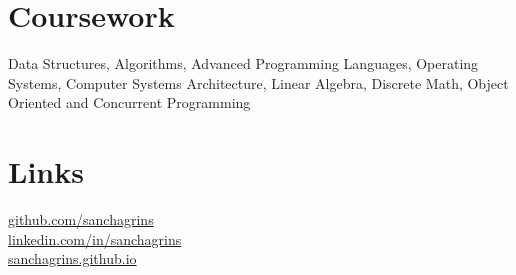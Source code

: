 \documentclass[]{sanchagrins-resume}
\begin{document}
\begin{minipage}[t]{0.33\textwidth}

\section{Coursework} 
Data Structures, Algorithms, Advanced Programming Languages,
Operating Systems, Computer Systems Architecture,
Linear Algebra, Discrete Math, Object Oriented and Concurrent Programming 

\sectionsep




\section{Links} 
{\href{https://github.com/sanchagrins}{\faGithub \hspace{2mm}github.com/sanchagrins}}\\
{\href{https://www.linkedin.com/in/sanchagrins}{\faLinkedinSquare \hspace{2mm}linkedin.com/in/sanchagrins}}\\
{\href{https://sanchagrins.github.io}{\faGlobe \hspace{2mm}sanchagrins.github.io}}


\sectionsep

%
%

\end{minipage} 
\hfill
\end{document}
